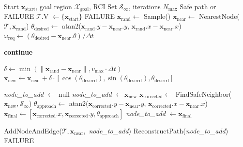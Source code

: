 \documentclass[conference]{IEEEtran}
\begin{document}
\begin{algorithm}[t]
    \caption{Safe RRT Algorithm}
    \label{alg:safe_rrt_detailed}
    \begin{algorithmic}[1]
        \Require Start $\mathbf{x}_{\text{start}}$, goal region $\mathcal{X}_{\text{goal}}$, RCI Set $\mathcal{S}_\infty$, iterations $N_{\max}$
        \Ensure Safe path or FAILURE
        \State $\mathcal{T}$.V $\gets \{\mathbf{x}_{\text{start}}\}$
         \Return FAILURE \EndIf
            \State $\mathbf{x}_{\text{rand}} \gets$ Sample() 
            \State $\mathbf{x}_{\text{near}} \gets$ NearestNode($\mathcal{T}, \mathbf{x}_{\text{rand}}$)
            \State $\theta_{\text{desired}} \gets$ atan2($\mathbf{x}_{\text{rand}}.y - \mathbf{x}_{\text{near}}.y$, $\mathbf{x}_{\text{rand}}.x - \mathbf{x}_{\text{near}}.x$)
            \State $\omega_{\text{req}} \gets (\theta_{\text{desired}} - \mathbf{x}_{\text{near}}.\theta) / \Delta t$
            
            \textbf{continue} \EndIf
            
            \State $\delta \gets \min(\|\mathbf{x}_{\text{rand}} - \mathbf{x}_{\text{near}}\|, v_{\max} \cdot \Delta t)$
            \State $\mathbf{x}_{\text{new}} \gets \mathbf{x}_{\text{near}} + \delta \cdot [\cos(\theta_{\text{desired}}), \sin(\theta_{\text{desired}}), \theta_{\text{desired}}]$
            
            \State \textit{node\_to\_add} $\gets$ null
                \State \textit{node\_to\_add} $\gets \mathbf{x}_{\text{new}}$
            \Else 
                \State $\mathbf{x}_{\text{corrected}} \gets$ FindSafeNeighbor($\mathbf{x}_{\text{new}}, \mathcal{S}_\infty$)
                    \State $\theta_{\text{approach}} \gets$ atan2($\mathbf{x}_{\text{corrected}}.y - \mathbf{x}_{\text{near}}.y$, $\mathbf{x}_{\text{corrected}}.x - \mathbf{x}_{\text{near}}.x$)
                    \State $\mathbf{x}_{\text{final}} \gets [\mathbf{x}_{\text{corrected}}.x, \mathbf{x}_{\text{corrected}}.y, \theta_{\text{approach}}]$
                        \State \textit{node\_to\_add} $\gets \mathbf{x}_{\text{final}}$
                    \EndIf
                \EndIf
            \EndIf
            
                \State AddNodeAndEdge($\mathcal{T}, \mathbf{x}_{\text{near}},$ \textit{node\_to\_add})
                    \State \Return ReconstructPath(\textit{node\_to\_add}) 
                \EndIf
            \EndIf
        \EndFor
        \State \Return FAILURE
    \end{algorithmic}
\end{algorithm}
\end{document}
